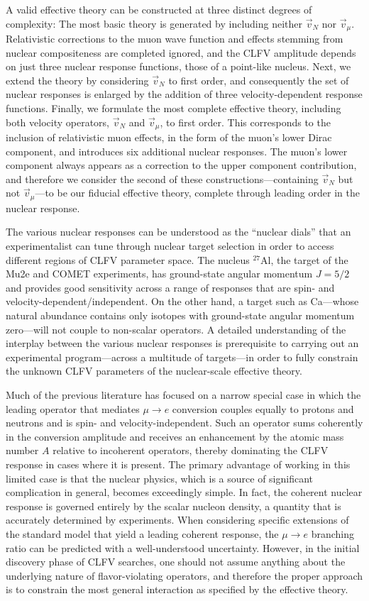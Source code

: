\documentclass{book}[letterpaper,12pt]
\begin{document}
A valid effective theory can be constructed at three distinct degrees of complexity: The most basic theory is generated by including neither $\vec{v}_N$ nor $\vec{v}_{\mu}$. Relativistic corrections to the muon wave function and effects stemming from nuclear compositeness are completed ignored, and the CLFV amplitude depends on just three nuclear response functions, those of a point-like nucleus. Next, we extend the theory by considering $\vec{v}_N$ to first order, and consequently the set of nuclear responses is enlarged by the addition of three velocity-dependent response functions. Finally, we formulate the most complete effective theory, including both velocity operators, $\vec{v}_N$ and $\vec{v}_{\mu}$, to first order. This corresponds to the inclusion of relativistic muon effects, in the form of the muon's lower Dirac component, and introduces six additional nuclear responses. The muon's lower component always appears as a correction to the upper component contribution, and therefore we consider the second of these constructions---containing $\vec{v}_N$ but not $\vec{v}_\mu$---to be our fiducial effective theory, complete through leading order in the nuclear response. 

The various nuclear responses can be understood as the ``nuclear dials'' that an experimentalist can tune through nuclear target selection in order to access different regions of CLFV parameter space. The nucleus $^{27}$Al, the target of the Mu2e and COMET experiments, has ground-state angular momentum $J=5/2$ and provides good sensitivity across a range of responses that are spin- and velocity-dependent/independent. On the other hand, a target such as Ca---whose natural abundance contains only isotopes with ground-state angular momentum zero---will not couple to non-scalar operators. A detailed understanding of the interplay between the various nuclear responses is prerequisite to carrying out an experimental program---across a multitude of targets---in order to fully constrain the unknown CLFV parameters of the nuclear-scale effective theory.

Much of the previous literature has focused on a narrow special case in which the leading operator that mediates $\mu\rightarrow e$ conversion couples equally to protons and neutrons and is spin- and velocity-independent. Such an operator sums coherently in the conversion amplitude and receives an enhancement by the atomic mass number $A$ relative to incoherent operators, thereby dominating the CLFV response in cases where it is present. The primary advantage of working in this limited case is that the nuclear physics, which is a source of significant complication in general, becomes exceedingly simple. In fact, the coherent nuclear response is governed entirely by the scalar nucleon density, a quantity that is accurately determined by experiments. When considering specific extensions of the standard model that yield a leading coherent response, the $\mu\rightarrow e$ branching ratio can be predicted with a well-understood uncertainty. However, in the initial discovery phase of CLFV searches, one should not assume anything about the underlying nature of flavor-violating operators, and therefore the proper approach is to constrain the most general interaction as specified by the effective theory.
\end{document}
